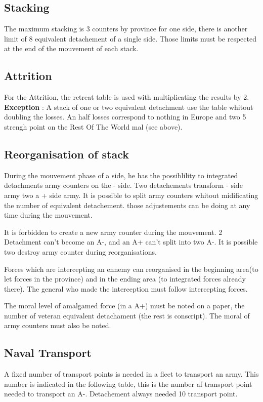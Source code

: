 \subsection{Stacking}
The maximum stacking is 3 counters by province for one side, there is
another limit of 8 equivalent detachement of a single side. Those limits
must be respected at the end of the mouvement of each stack.

\subsection{Attrition}

For the Attrition, the retreat table is used with
multiplicating the results by 2. \\
{\bf Exception} : A stack of one or two equivalent detachment use the
table whitout doubling the losses. An half losses correspond to nothing in
Europe and two 5 strengh point on the Rest Of The World mal (see above).

\attrition

\subsection{Reorganisation of stack}
During the mouvement phase of a side, he has the possiblility to
integrated detachments army counters on the - side. Two detachements
transform - side army two  a + side army. It is possible to split army
counters whitout midificating the number of equivalent detachement. those
adjustements can be doing at any time during the mouvement.

It is forbidden to create a new army counter during the mouvement. 2  
Detachment can't become an A-, and an A+ can't split into two A-. It is
possible two destroy army counter during reorganisations.

Forces which are intercepting an ennemy can reorganised in the beginning
area(to let forces in the province) and in the ending area (to integrated
forces already there). The general who made the interception must follow
intercepting forces.

The moral level of amalgamed force (in a A+) must be noted on a paper,  
the number of veteran equivalent detachament (the rest is conscript). The
moral of army counters must also be noted.


\subsection{Naval Transport}
A fixed number of transport points is needed in a fleet to transport an
army. This number is indicated in the following table, this is the number
af transport point needed to transport an A-. Detachement always needed 10
transport point.

